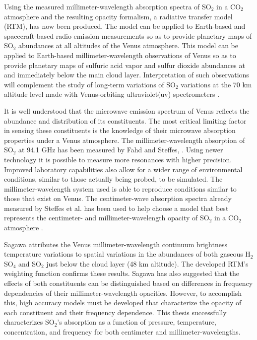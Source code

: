 Using the measured millimeter-wavelength absorption spectra of SO$_2$ in a CO$_2$ atmosphere and the resulting opacity formalism, a radiative transfer model (RTM), has now been produced. The model can be applied to Earth-based and spacecraft-based radio emission measurements so as to provide planetary maps of SO$_2$ abundances at all altitudes of the Venus atmosphere. %
This model can be applied to Earth-based millimeter-wavelength observations of Venus so as to provide planetary maps of sulfuric acid vapor and sulfur dioxide abundances at and immediately below the main cloud layer. Interpretation of such observations will complement the study of long-term variations of SO$_2$ variations at the 70 km altitude level made with Venus-orbiting ultraviolet(uv) spectrometers \cite{Esposito-2012}. 

It is well understood that the microwave emission spectrum of Venus reflects the abundance and distribution of its constituents. The most critical limiting factor in sensing these constituents is the knowledge of their microwave absorption properties under a Venus atmosphere. 
The millimeter-wavelength absorption of SO$_2$ at 94.1 GHz has been measured by Fahd and Steffes, \cite{Fahd-thesis}. 
Using newer technology it is possible to measure more resonances with higher precision. Improved laboratory capabilities also allow for a wider range of environmental conditions, similar to those actually being probed, to be simulated. The millimeter-wavelength system used is able to reproduce conditions similar to those that exist on Venus. The centimeter-wave absorption spectra already measured by Steffes et al. \cite{Steffes-2015} has been used to help choose a model that best represents the centimeter- and millimeter-wavelength opacity of SO$_2$ in a CO$_2$ atmosphere \cite{Butler-2001}. 

Sagawa \cite{Sagawa-2008} attributes the Venus millimeter-wavelength continuum brightness temperature variations to spatial variations in the abundances of both gaseous H$_2$SO$_4$ and SO$_2$ just below the cloud layer (48 km altitude). The developed RTM's weighting function confirms these results. Sagawa has also suggested that the effects of both constituents can be distinguished based on differences in frequency dependencies of their millimeter-wavelength opacities. However, to accomplish this, high accuracy models must be developed that characterize the opacity of each constituent and their frequency dependence. This thesis successfully characterizes SO$_2$'s absorption as a function of pressure, temperature, concentration, and frequency for both centimeter and millimeter-wavelengths. 


